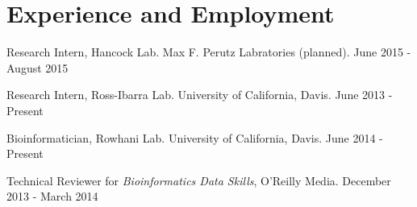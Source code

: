 \documentclass[letterpaper]{article}
\renewenvironment{itemize}{
  \begin{list}{}{
    \setlength{\leftmargin}{1em}
  }
}{
  \end{list}
}
\begin{document}
\section*{Experience and Employment}
\begin{itemize}
\item Research Intern, Hancock Lab. Max F. Perutz Labratories (planned). \hfill June 2015 - August 2015
\item Research Intern, Ross-Ibarra Lab. University of California, Davis. \hfill June 2013 - Present
\item Bioinformatician, Rowhani Lab. University of California, Davis. \hfill June 2014 - Present
\item Technical Reviewer for \textit{Bioinformatics Data Skills}, O'Reilly Media. \hfill December 2013 - March 2014

\end{itemize}
\end{document}
